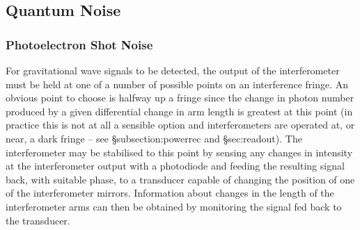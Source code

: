\documentclass{article}
\begin{document}

\subsection{Quantum Noise}
\label{subsection:quantumnoise}

\subsubsection{Photoelectron Shot Noise}
\label{subsubsection:shotnoise}

For gravitational wave signals to be detected, the output of the interferometer
must be held at one of a number of possible points on an interference fringe. An
obvious point to choose is halfway up a fringe since the change in photon number
produced by a given differential change in arm length is greatest at this
point (in practice this is not at all a sensible option and interferometers
are operated at, or near, a dark fringe -- see \S{subsection:powerrec} and
\S{sec:readout}). The interferometer may be stabilised to this point by sensing
any changes in intensity at the interferometer output with a photodiode and
feeding the resulting signal back, with suitable phase, to a transducer capable
of changing the position of one of the interferometer mirrors.  Information
about changes in the length of the interferometer arms can then be obtained by
monitoring the signal fed back to the transducer.
\end{document}
